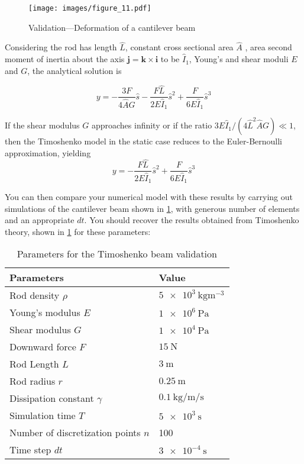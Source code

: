 \documentclass[11pt]{article}
\begin{document}
\begin{figure}[htbp]
\centering
\texttt{[image: images/figure\_11.pdf]}
\caption{\label{p1_fig}
Validation---Deformation of a cantilever beam}
\end{figure}
Considering the rod has length
 \(\hat{L}\), constant cross sectional area \(\hat{A}\) , area second moment of
 inertia about the axis \(\mathbf{j}=\mathbf{k}\times\mathbf{i}\) to be
 \(\hat{I}_1\), Young's and shear moduli \(E\) and \(G\), the analytical solution is

\[ y=-\frac{3F}{4\hat{A}G}\hat{s} -
	\frac{F\hat{L}}{2E\hat{I}_1}\hat{s}^2 + \frac{F}{6E\hat{I}_1}\hat{s}^3 \]

If the shear modulus \(G\) approaches infinity or if the ratio
\(3E\hat{I}_1/(4\hat{L}^2\hat{A}G)\ll 1\), then the Timoshenko model in the
static case reduces to the Euler-Bernoulli approximation, yielding
\[ y= - \frac{F\hat{L}}{2E\hat{I}_1}\hat{s}^2 +
	\frac{F}{6E\hat{I}_1}\hat{s}^3 \]

You can then compare your numerical model with these results by carrying out
simulations of the cantilever beam shown in \cref{p1_fig}, with generous number
of elements and an appropriate \(dt\). You should recover the results
obtained from Timoshenko theory, shown in \cref{p1_fig} for these parameters:

\begin{table}[htbp]
\caption{\label{timoshenko_params}
Parameters for the Timoshenko beam validation}
\centering
\begin{tabular}{ll}
\toprule
Parameters & Value\\
\midrule
Rod density \(\rho\) & \(\SI{5e3}{\kg \m^{-3}}\)\\
Young's modulus \(E\) & \(\SI{1e6}{\Pa}\)\\
Shear modulus \(G\) & \(\SI{1e4}{\Pa}\)\\
Downward force \(F\) & \(\SI{15}{\N}\)\\
Rod Length \(L\) & \(\SI{3}{\m}\)\\
Rod radius \(r\) & \(\SI{0.25}{\m}\)\\
Dissipation constant \(\gamma\) & \(\SI{0.1}{\kg\per\m\per\second}\)\\
Simulation time \(T\) & \(\SI{5e3}{\second}\)\\
Number of discretization points \(n\) & 100\\
Time step \(dt\) & \(\SI{3e-4}{\second}\)\\
\bottomrule
\end{tabular}
\end{table}
\end{document}
